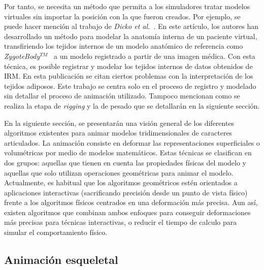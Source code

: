 Por tanto, se necesita un método que permita a los simuladores tratar modelos virtuales sin importar la posición con la que fueron creados. %
Por ejemplo, se puede hacer mención al trabajo de  \emph{Dicko et al.}~\cite{Ali2013}.  En este artículo, los autores han desarrollado un método para modelar la anatomía interna de un paciente virtual, transfiriendo los tejidos internos de un modelo anatómico de referencia como \emph{ZygoteBody}$^{TM}$~\cite{kelc2012zygote} a un modelo registrado a partir de una imagen médica. Con esta técnica, es posible registrar y modelar los tejidos internos de datos obtenidos de \ac{IRM}. En esta publicación se citan ciertos problemas con la interpretación de los tejidos adiposos. Este trabajo se centra solo en el proceso de registro y modelado sin detallar el proceso de animación utilizado. Tampoco mencionan como se realiza la etapa de \emph{rigging} y la de pesado que se detallarán en la siguiente sección.  


En la siguiente sección, se presentarán una visión general de los diferentes algoritmos existentes para animar modelos tridimensionales de caracteres articulados. La animación consiste en deformar las representaciones superficiales 
o volumétricas por medio de modelos matemáticos. Estas técnicas se clasifican en dos grupos: aquellas que tienen en cuenta las propiedades físicas del modelo y aquellas que solo utilizan operaciones geométricas para animar el modelo. Actualmente, es habitual que los algoritmos geométricos estén orientados a aplicaciones interactivas %
(sacrificando precisión desde un punto de vista físico) frente a los algoritmos físicos centrados en una deformación más precisa. Aun así, existen algoritmos que combinan ambos enfoques para conseguir deformaciones más precisas para técnicas interactivas, o reducir el tiempo de calculo para simular el comportamiento físico. 


\subsection{Animación esqueletal}
\label{art:animation}
\label{art:virtualskel}

